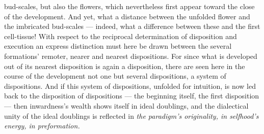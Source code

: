 \documentclass[12pt,a4paper]{book}
\begin{document}
\setcounter{footnote}{0}
bud-scales, but also the flowers, which nevertheless first appear toward the
close of the development. And yet, what a distance between the unfolded flower
and the imbricated bud-scales --- indeed, what a difference between these and
the first cell-tissue! With respect to the reciprocal determination of
disposition and execution an express distinction must here be drawn between the
several formations' remoter, nearer and nearest dispositions. For since what is
developed out of its nearest disposition is again a disposition, there are seen
here in the course of the development not one but several dispositions, a
system of dispositions. And if this system of dispositions, unfolded for
intuition, is now led back to the disposition of dispositions --- the beginning
itself, the first disposition --- then inwardness's wealth shows itself in
ideal doublings, and the dialectical unity of the ideal doublings is reflected
in \emph{the paradigm's originality, in selfhood's energy, in preformation.}
\end{document}
